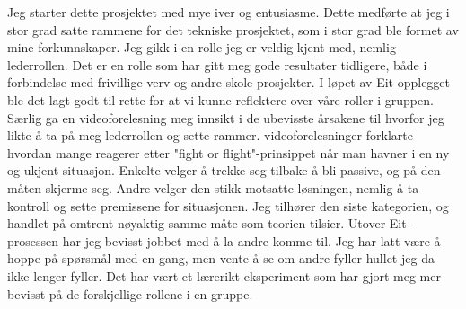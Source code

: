 Jeg starter dette prosjektet med mye iver og entusiasme. 
Dette medførte at jeg i stor grad satte rammene for det tekniske prosjektet, som i stor grad ble formet av mine forkunnskaper.
Jeg gikk i en rolle jeg er veldig kjent med, nemlig lederrollen. 
Det er en rolle som har gitt meg gode resultater tidligere, både i forbindelse med frivillige verv og andre skole-prosjekter.
I løpet av Eit-opplegget ble det lagt godt til rette for at vi kunne reflektere over våre roller i gruppen.
Særlig ga en videoforelesning meg innsikt i de ubevisste årsakene til hvorfor jeg likte å ta på meg lederrollen og sette rammer. 
videoforelesninger forklarte hvordan mange reagerer etter "fight or flight"-prinsippet når man havner i en ny og ukjent situasjon.
Enkelte velger å trekke seg tilbake å bli passive, og på den måten skjerme seg. 
Andre velger den stikk motsatte løsningen, nemlig å ta kontroll og sette premissene for situasjonen. 
Jeg tilhører den siste kategorien, og handlet på omtrent nøyaktig samme måte som teorien tilsier.
Utover Eit-prosessen har jeg bevisst jobbet med å la andre komme til.
Jeg har latt være å hoppe på spørsmål med en gang, men vente å se om andre fyller hullet jeg da ikke lenger fyller. Det har vært et lærerikt eksperiment som har gjort meg mer bevisst på de forskjellige rollene i en gruppe.
